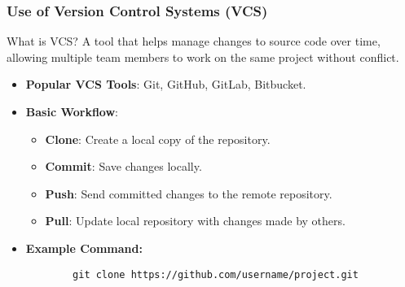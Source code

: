 \documentclass[aspectratio=169]{beamer}
\begin{document}
\begin{frame}[fragile]
    \frametitle{Use of Version Control Systems (VCS)}
    \begin{block}{What is VCS?}
        A tool that helps manage changes to source code over time, allowing multiple team members to work on the same project without conflict.
    \end{block}
    \begin{itemize}
        \item \textbf{Popular VCS Tools}: Git, GitHub, GitLab, Bitbucket.
        \item \textbf{Basic Workflow}:
        \begin{itemize}
            \item \textbf{Clone}: Create a local copy of the repository.
            \item \textbf{Commit}: Save changes locally.
            \item \textbf{Push}: Send committed changes to the remote repository.
            \item \textbf{Pull}: Update local repository with changes made by others.
        \end{itemize}
        \item \textbf{Example Command:}
        \begin{lstlisting}
        git clone https://github.com/username/project.git
        \end{lstlisting}
    \end{itemize}
\end{frame}
\end{document}
